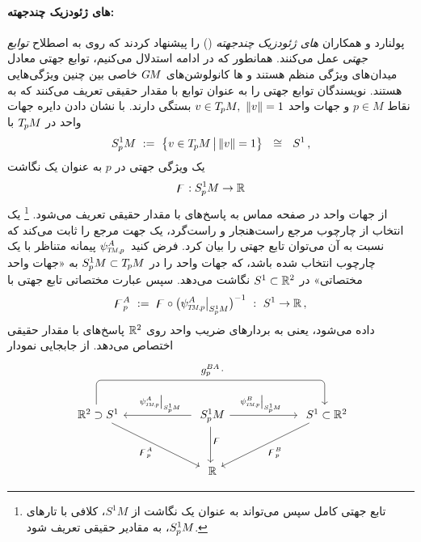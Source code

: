 \paragraph{های ژئودزیک چندجهته:}
پولنارد و همکاران\cite{poulenard2018multi} \emph{های ژئودزیک چندجهته} () را پیشنهاد کردند که روی به اصطلاح \emph{توابع جهتی} عمل می‌کنند.
همانطور که در ادامه استدلال می‌کنیم، توابع جهتی معادل میدان‌های ویژگی منظم هستند و ها کانولوشن‌های $G\mkern-1.4muM$ خاصی بین چنین ویژگی‌هایی هستند.
نویسندگان توابع جهتی را به عنوان توابع با مقدار حقیقی تعریف می‌کنند که به نقاط $p\in M$ و جهات واحد $v\in T_{\mkern-1.5mu p}\mkern-.5muM,\ \lVert v\rVert=1$ بستگی دارند.
با نشان دادن دایره جهات واحد در $T_{\mkern-1.5mu p}\mkern-.5muM$ با
\begin{align}
    \SpM\ :=\ \big\{ v\in\TpM \,\big|\, \lVert v\rVert = 1 \big\} \ \ \cong\ \ S^1 \,,
\end{align}
یک ویژگی جهتی در $p$ به عنوان یک نگاشت
\begin{align}
    \digamma: S^1_{\mkern-.5mu p}\mkern-.5muM \to \mathbb{R}
\end{align}
از جهات واحد در صفحه مماس به پاسخ‌های با مقدار حقیقی تعریف می‌شود.%
\footnote{
    تابع جهتی کامل سپس می‌تواند به عنوان یک نگاشت از ${S^1\!M}$، کلافی با تارهای $S^1_{\mkern-.5mu p}\mkern-.5muM$، به مقادیر حقیقی تعریف شود.
}
یک انتخاب از چارچوب مرجع راست‌هنجار و راست‌گرد، یک جهت مرجع را ثابت می‌کند که نسبت به آن می‌توان تابع جهتی را بیان کرد.
فرض کنید~$\psiTMp^A$ پیمانه متناظر با یک چارچوب انتخاب شده باشد، که جهات واحد را در $S^1_{\mkern-.5mu p}\mkern-.5muM \subset T_{\mkern-1.5mu p}\mkern-.5muM$ به «جهات واحد مختصاتی» در $S^1 \subset \mathbb{R}^2$ نگاشت می‌دهد.
سپس عبارت مختصاتی تابع جهتی با
\begin{align}\label{eq:directional_functions_trafo_law_regular}
    \digamma_p^A\ :=\ \digamma \circ \big(\psiTMp^A \big|_{\SpM} \big)^{-1}\ :\ S^1 \to \R \,,
\end{align}
داده می‌شود، یعنی به بردارهای ضریب واحد روی $\mathbb{R}^2$ پاسخ‌های با مقدار حقیقی اختصاص می‌دهد.
از جابجایی نمودار
\begin{equation}\label{cd:directional_function_trafo_law}
\begin{tikzcd}[column sep=60, row sep=32, font=\normalsize]
    \R^2 \supset S^1
        \arrow[rr, rounded corners, to path={ 
            -- ([yshift=5.ex]\tikztostart.north) 
            --node[above, pos=.5]{\small$g_p^{BA} \mkern2mu\cdot$} ([yshift=5.ex]\tikztotarget.north) 
            -- (\tikztotarget.north)
            }]
        \arrow[dr, "\digamma_p^A"']
    & \SpM
        \arrow[d, pos=.4, "\digamma"]
        \arrow[l, pos=.46, "\psiTMp^A \big|_{\SpM}"']
        \arrow[r, pos=.46, "\psiTMp^B \big|_{\SpM}"]
    &  S^1 \subset \R^2
        \arrow[dl, "\digamma_p^B"]
    \\
    & \R
\end{tikzcd}
\end{equation}
